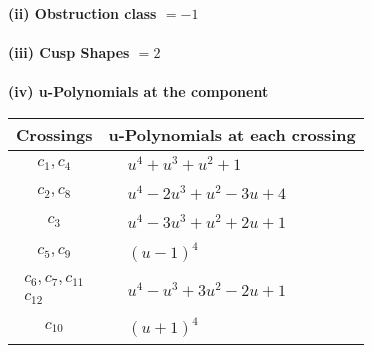 \documentclass[1p]{elsarticle_modified}
\theoremstyle{definition}
\begin{document}
\flushleft \textbf{(ii) Obstruction class $= -1$}\\~\\
\flushleft \textbf{(iii) Cusp Shapes $= 2$}\\~\\
\newpage\renewcommand{\arraystretch}{1}
\flushleft \textbf{(iv) u-Polynomials at the component}\newline \\
\begin{tabular}{m{50pt}|m{274pt}}
Crossings & \hspace{64pt}u-Polynomials at each crossing \\
\hline $$\begin{aligned}c_{1},c_{4}\end{aligned}$$&$\begin{aligned}
&u^4+u^3+u^2+1
\end{aligned}$\\
\hline $$\begin{aligned}c_{2},c_{8}\end{aligned}$$&$\begin{aligned}
&u^4-2 u^3+u^2-3 u+4
\end{aligned}$\\
\hline $$\begin{aligned}c_{3}\end{aligned}$$&$\begin{aligned}
&u^4-3 u^3+u^2+2 u+1
\end{aligned}$\\
\hline $$\begin{aligned}c_{5},c_{9}\end{aligned}$$&$\begin{aligned}
&(u-1)^4
\end{aligned}$\\
\hline $$\begin{aligned}c_{6},c_{7},c_{11}\\c_{12}\end{aligned}$$&$\begin{aligned}
&u^4- u^3+3 u^2-2 u+1
\end{aligned}$\\
\hline $$\begin{aligned}c_{10}\end{aligned}$$&$\begin{aligned}
&(u+1)^4
\end{aligned}$\\
\hline
\end{tabular}\\~\\
\end{document}
